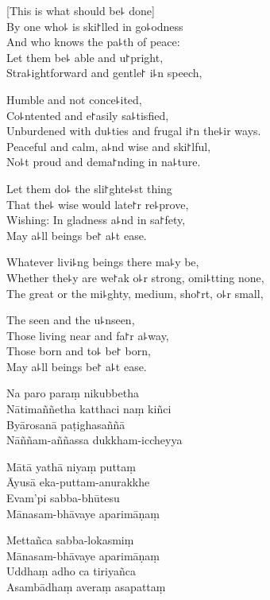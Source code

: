 
\begin{leader}
\end{leader}

[This is what should be꜕ done]\\
By one who꜕ is ski꜓lled in go꜕odness\\
And who knows the pa꜕th of peace:\\
Let them be꜕ able and u꜓pright,\\
Stra꜕ightforward and gentle꜓ i꜕n speech,

Humble and not conce꜕ited,\\
Co꜕ntented and e꜓asily sa꜕tisfied,\\
Unburdened with du꜕ties and frugal i꜓n the꜕ir ways.\\
Peaceful and calm, a꜕nd wise and ski꜓lful,\\
No꜕t proud and dema꜓nding in na꜕ture.

Let them  do꜕ the sli꜓ghte꜕st thing\\
That the꜕ wise would late꜓r re꜕prove,\\
Wishing: In gladness a꜕nd in sa꜓fety,\\
May a꜕ll beings be꜓ a꜕t ease.

Whatever livi꜕ng beings there ma꜕y be,\\
Whether the꜕y are we꜓ak o꜕r strong, omi꜕tting none,\\
The great or the mi꜕ghty, medium, sho꜓rt, o꜕r small,

The seen and the u꜕nseen,\\
Those living near and fa꜓r a꜕way,\\
Those born and to꜕ be꜓ born,\\
May a꜕ll beings be꜓ a꜕t ease.

\clearpage

Na paro paraṃ nikubbetha\\%
Nātimaññetha katthaci naṃ kiñci\\
Byārosanā paṭighasaññā\\
Nāññam-aññassa dukkham-iccheyya

Mātā yathā niyaṃ puttaṃ\\
Āyusā eka-puttam-anurakkhe\\
Evam'pi sabba-bhūtesu\\
Mānasam-bhāvaye aparimāṇaṃ

Mettañca sabba-lokasmiṃ\\
Mānasam-bhāvaye aparimāṇaṃ\\
Uddhaṃ adho ca tiriyañca\\
Asambādhaṃ averaṃ asapattaṃ

